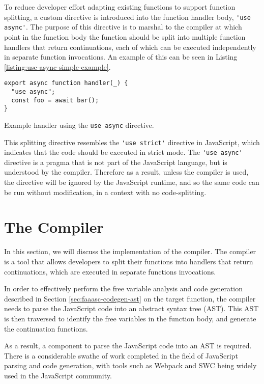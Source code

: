 To reduce developer effort adapting existing functions to support function splitting, a custom directive is introduced into the function handler body, \verb|'use async'|. The purpose of this directive is to marshal to the \faaasc{} compiler at which point in the function body the function should be split into multiple function handlers that return continuations, each of which can be executed independently in separate \awslambda{} function invocations. An example of this can be seen in Listing \ref{listing:use-async-simple-example}.

\begin{listing}[H]
\begin{verbatim}
export async function handler(_) {
  "use async";
  const foo = await bar();
}
\end{verbatim}
\caption{Example \faaas{} handler using the \texttt{use async} directive.}
\label{listing:use-async-simple-example}
\end{listing}

This splitting directive resembles the \verb|'use strict'| directive in JavaScript, which indicates that the code should be executed in strict mode. The \verb|'use async'| directive is a pragma that is not part of the JavaScript language, but is understood by the \faaasc{} compiler. Therefore as a result, unless the \faaasc{} compiler is used, the directive will be ignored by the JavaScript runtime, and so the same code can be run without modification, in a context with no code-splitting.

\section{The \faaasc{} Compiler}
In this section, we will discuss the implementation of the \faaasc{} compiler. The \faaasc{} compiler is a tool that allows developers to split their functions into handlers that return continuations, which are executed in separate \awslambda{} functions invocations.

In order to effectively perform the free variable analysis and code generation described in Section \ref{sec:faaasc-codegen-ast} on the target \faas{} function, the \faaasc{} compiler needs to parse the JavaScript code into an abstract syntax tree (AST). This AST is then traversed to identify the free variables in the function body, and generate the continuation functions.

As a result, a component to parse the JavaScript code into an AST is required. There is a considerable swathe of work completed in the field of JavaScript parsing and code generation, with tools such as Webpack\cite{Webpack} and SWC\cite{RustbasedPlatformWeb} being widely used in the JavaScript community.

